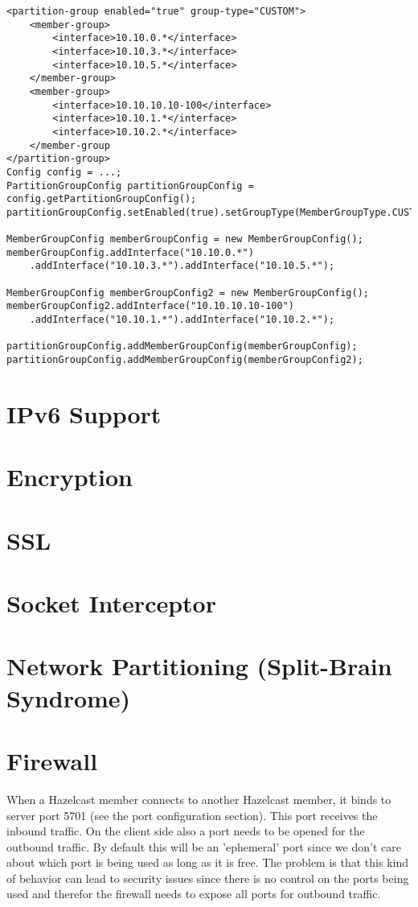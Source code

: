 \begin{lstlisting}
<partition-group enabled="true" group-type="CUSTOM">
    <member-group>
        <interface>10.10.0.*</interface>
        <interface>10.10.3.*</interface>
        <interface>10.10.5.*</interface>
    </member-group>
    <member-group>
        <interface>10.10.10.10-100</interface>
        <interface>10.10.1.*</interface>
        <interface>10.10.2.*</interface>
    </member-group
</partition-group>
Config config = ...;
PartitionGroupConfig partitionGroupConfig = config.getPartitionGroupConfig();
partitionGroupConfig.setEnabled(true).setGroupType(MemberGroupType.CUSTOM);

MemberGroupConfig memberGroupConfig = new MemberGroupConfig();
memberGroupConfig.addInterface("10.10.0.*")
    .addInterface("10.10.3.*").addInterface("10.10.5.*");

MemberGroupConfig memberGroupConfig2 = new MemberGroupConfig();
memberGroupConfig2.addInterface("10.10.10.10-100")
    .addInterface("10.10.1.*").addInterface("10.10.2.*");

partitionGroupConfig.addMemberGroupConfig(memberGroupConfig);
partitionGroupConfig.addMemberGroupConfig(memberGroupConfig2);
\end{lstlisting}

\section{IPv6 Support}

\section{Encryption}

\section{SSL}

\section{Socket Interceptor}

\section{Network Partitioning (Split-Brain Syndrome)}

\section{Firewall}
When a Hazelcast member connects to another Hazelcast member, it binds to server port 5701 (see the port configuration section). This port receives the inbound traffic. On the client side also a port needs to be opened for the outbound traffic. By default this will be an 'ephemeral' port since we don't care about which port is being used as long as it is free. The problem is that this kind of behavior can lead to security issues since there is no control on the ports being used and therefor the firewall needs to expose all ports for outbound traffic. 

